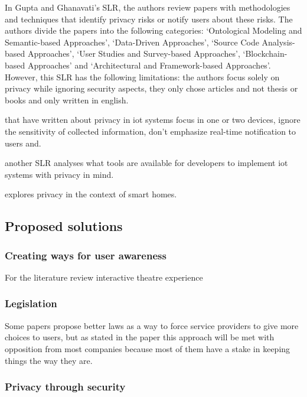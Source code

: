 \documentclass[conference]{IEEEtran}
\begin{document}
In Gupta and Ghanavati's \cite{Gupta2022Privacy} SLR,
the authors review papers with methodologies and techniques that identify privacy risks or
notify users about these risks. The authors divide the papers into the following
categories: `Ontological Modeling and Semantic-based Approaches', `Data-Driven Approaches',
`Source Code Analysis-based Approaches', `User Studies and Survey-based Approaches',
`Blockchain-based Approaches' and `Architectural and Framework-based Approaches'.
However, this SLR has the following limitations: the authors focus solely on privacy
while ignoring security aspects, they only chose articles and not thesis or books and only
written in english.



that have written about privacy in iot systems focus in one or two devices,
ignore the sensitivity of collected information, don't emphasize real-time
notification to users and.

another SLR \cite{KUHTREIBER2022101656} analyses what tools are available for developers
to implement iot systems with privacy in mind.

\cite{AbbottPrivacy} explores privacy in the context of smart homes.

\subsection{Proposed solutions}

\subsubsection{Creating ways for user awareness}

For the literature review interactive theatre experience \cite{SkirpanPrivacy}

\subsubsection{Legislation}

Some papers propose better laws \cite{} as a way to force service providers
to give more choices to users, but as stated in the paper this
approach will be met with opposition from most companies because
most of them have a stake in keeping things the way they are.

\subsubsection{Privacy through security}
\end{document}
